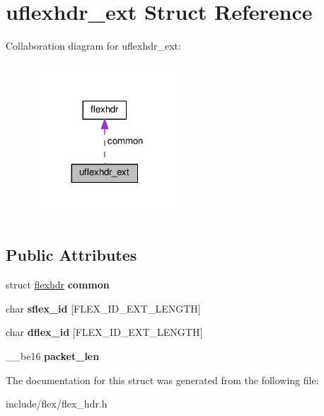 \hypertarget{structuflexhdr__ext}{}\section{uflexhdr\+\_\+ext Struct Reference}
\label{structuflexhdr__ext}


Collaboration diagram for uflexhdr\+\_\+ext\+:\nopagebreak
\begin{figure}[H]
\begin{center}
\leavevmode
\includegraphics[width=156pt]{structuflexhdr__ext__coll__graph}
\end{center}
\end{figure}
\subsection*{Public Attributes}
\begin{DoxyCompactItemize}
\item 
struct \hyperlink{structflexhdr}{flexhdr} {\bfseries common}\hypertarget{structuflexhdr__ext_af481d03a7524a0f483e6fd8877c00563}{}\label{structuflexhdr__ext_af481d03a7524a0f483e6fd8877c00563}

\item 
char {\bfseries sflex\+\_\+id} \mbox{[}F\+L\+E\+X\+\_\+\+I\+D\+\_\+\+E\+X\+T\+\_\+\+L\+E\+N\+G\+TH\mbox{]}\hypertarget{structuflexhdr__ext_abf9a4c10efddc6b46acf9e25915cdcb3}{}\label{structuflexhdr__ext_abf9a4c10efddc6b46acf9e25915cdcb3}

\item 
char {\bfseries dflex\+\_\+id} \mbox{[}F\+L\+E\+X\+\_\+\+I\+D\+\_\+\+E\+X\+T\+\_\+\+L\+E\+N\+G\+TH\mbox{]}\hypertarget{structuflexhdr__ext_a61d75d5fd362fb576a53fa8f973c2380}{}\label{structuflexhdr__ext_a61d75d5fd362fb576a53fa8f973c2380}

\item 
\+\_\+\+\_\+be16 {\bfseries packet\+\_\+len}\hypertarget{structuflexhdr__ext_aa8dd1115a6af281d1a91102926d5cd4d}{}\label{structuflexhdr__ext_aa8dd1115a6af281d1a91102926d5cd4d}

\end{DoxyCompactItemize}


The documentation for this struct was generated from the following file\+:\begin{DoxyCompactItemize}
\item 
include/flex/flex\+\_\+hdr.\+h\end{DoxyCompactItemize}

